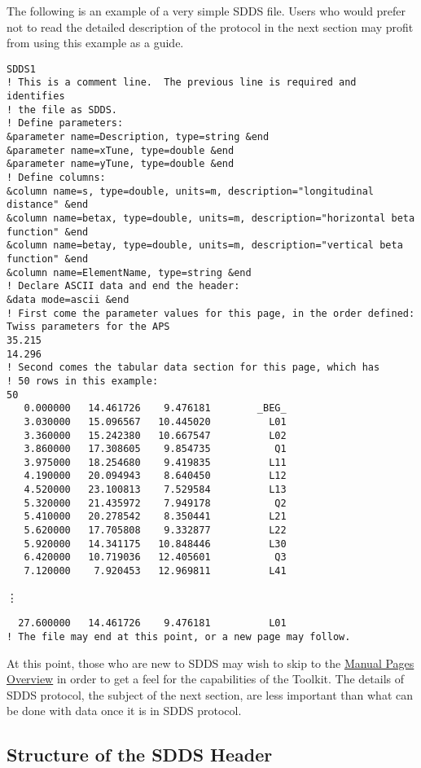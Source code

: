 \documentclass[11pt]{article}
\begin{document}
The following is an example of a very simple SDDS file.  Users who
would prefer not to read the detailed description of the protocol in
the next section may profit from using this example as a guide.
\begin{flushleft}
\begin{verbatim}
SDDS1
! This is a comment line.  The previous line is required and identifies 
! the file as SDDS.
! Define parameters: 
&parameter name=Description, type=string &end
&parameter name=xTune, type=double &end
&parameter name=yTune, type=double &end
! Define columns:
&column name=s, type=double, units=m, description="longitudinal distance" &end
&column name=betax, type=double, units=m, description="horizontal beta function" &end
&column name=betay, type=double, units=m, description="vertical beta function" &end
&column name=ElementName, type=string &end
! Declare ASCII data and end the header:
&data mode=ascii &end
! First come the parameter values for this page, in the order defined:
Twiss parameters for the APS
35.215
14.296
! Second comes the tabular data section for this page, which has
! 50 rows in this example:
50
   0.000000   14.461726    9.476181        _BEG_ 
   3.030000   15.096567   10.445020          L01 
   3.360000   15.242380   10.667547          L02 
   3.860000   17.308605    9.854735           Q1 
   3.975000   18.254680    9.419835          L11 
   4.190000   20.094943    8.640450          L12 
   4.520000   23.100813    7.529584          L13 
   5.320000   21.435972    7.949178           Q2 
   5.410000   20.278542    8.350441          L21 
   5.620000   17.705808    9.332877          L22 
   5.920000   14.341175   10.848446          L30 
   6.420000   10.719036   12.405601           Q3 
   7.120000    7.920453   12.969811          L41 
\end{verbatim}
\vdots
\begin{verbatim}
  27.600000   14.461726    9.476181          L01 
! The file may end at this point, or a new page may follow.
\end{verbatim}
\end{flushleft}

At this point, those who are new to SDDS may wish to skip to the \hyperref[ManualPagesOverview]{Manual Pages Overview} in order to get a feel for the capabilities of the Toolkit.  The details of SDDS protocol,
the subject of the next section, are less important than what can be done with data once it is in SDDS protocol.

\subsection{Structure of the SDDS Header}
\label{sect:header}
\end{document}
